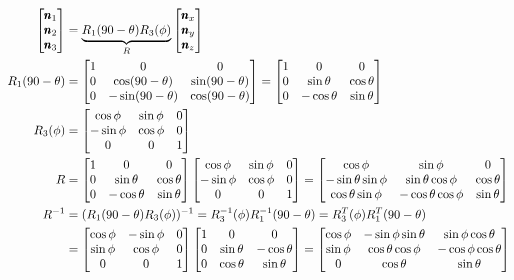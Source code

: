 \begin{align*}
    \begin{bmatrix} \pmb n_1 \\ \pmb n_2 \\ \pmb n_3 \end{bmatrix} &= \underbrace{R_1(90 - \theta) R_3(\phi)}_{R} \begin{bmatrix} \pmb n_x \\ \pmb n_y \\ \pmb n_z \end{bmatrix}\\
    R_1(90 - \theta) &= \begin{bmatrix} 1 & 0 & 0 \\
                            0 & \cos (90-\theta) & \sin (90 - \theta) \\
                            0 &-\sin (90 - \theta) & \cos (90 - \theta) \end{bmatrix}
                      = \begin{bmatrix} 1 & 0 & 0\\
                            0 & \sin \theta & \cos \theta \\
                            0 & -\cos \theta & \sin \theta \end{bmatrix} \\
    R_3(\phi) &= \begin{bmatrix} \cos \phi & \sin \phi & 0\\
                    -\sin \phi & \cos \phi & 0\\
                    0 & 0 & 1 \end{bmatrix}\\
    R &=\begin{bmatrix} 1 & 0 & 0\\
            0 & \sin \theta & \cos \theta \\
            0 & -\cos \theta & \sin \theta \end{bmatrix}
        \begin{bmatrix} \cos \phi & \sin \phi & 0\\
           -\sin \phi & \cos \phi & 0\\
            0 & 0 & 1 \end{bmatrix}
        = \begin{bmatrix} \cos \phi & \sin \phi & 0\\
              -\sin \theta \sin \phi & \sin \theta \cos \phi & \cos \theta\\
              \cos \theta \sin \phi & -\cos \theta \cos \phi & \sin \theta \end{bmatrix}\\
    R^{-1} &=(R_1(90 - \theta) R_3(\phi))^{-1} = R_3^{-1} (\phi) R_1^{-1}(90 - \theta) = R_3^{T} (\phi) R_1^{T}(90 - \theta)\\
    &= \begin{bmatrix} \cos \phi & -\sin \phi & 0\\
          \sin \phi & \cos \phi & 0\\
           0 & 0 & 1 \end{bmatrix}
        \begin{bmatrix} 1 & 0 & 0\\
           0 & \sin \theta & -\cos \theta \\
           0 & \cos \theta & \sin \theta \end{bmatrix}
    = \begin{bmatrix} \cos \phi & - \sin \phi \sin \theta & \sin \phi \cos \theta \\
          \sin \phi & \cos \theta \cos \phi & - \cos \phi \cos \theta \\
          0         & \cos \theta           & \sin \theta  \end{bmatrix}
\end{align*}

